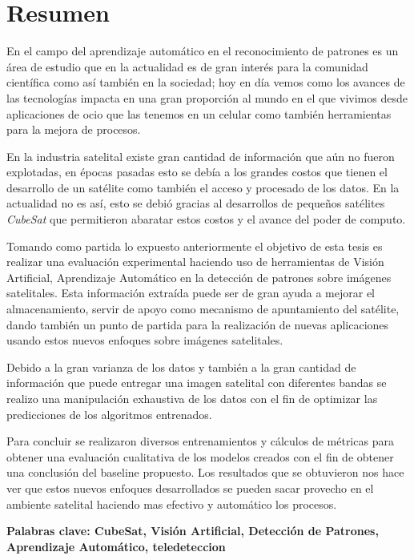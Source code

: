 \chapter*{Resumen}
\label{chap:resumen}

En el campo del aprendizaje automático en el reconocimiento de patrones es un área de estudio que en la actualidad es de gran interés para la comunidad científica como así también en la sociedad; hoy en día vemos como los avances de las tecnologías impacta en una gran proporción al mundo en el que vivimos desde aplicaciones de ocio que las tenemos en un celular como también herramientas para la mejora de procesos.

En la industria satelital existe gran cantidad de información que aún no fueron explotadas, en épocas pasadas esto se debía a los grandes costos que tienen el desarrollo de un satélite como también el acceso y procesado de los datos. En la actualidad no es así, esto se debió gracias al desarrollos de pequeños satélites \textit{CubeSat} que permitieron abaratar estos costos y el avance del poder de computo.

Tomando como partida lo expuesto anteriormente el objetivo de esta tesis es realizar una evaluación experimental haciendo uso  de herramientas de Visión Artificial, Aprendizaje Automático en la detección de patrones sobre imágenes satelitales. Esta información extraída puede ser de gran ayuda a mejorar el almacenamiento, servir de apoyo como mecanismo de apuntamiento del satélite, dando también un punto de partida para la realización de nuevas aplicaciones usando estos nuevos enfoques sobre imágenes satelitales.

Debido a la gran varianza de los datos y también a la gran cantidad de información que puede entregar una imagen satelital con diferentes bandas se realizo una manipulación exhaustiva de los datos con el fin de optimizar las predicciones de los algoritmos entrenados. 

Para concluir se realizaron diversos entrenamientos y cálculos de métricas para obtener una evaluación cualitativa de los modelos creados con el fin de obtener una conclusión del baseline propuesto. Los resultados que se obtuvieron nos hace ver que estos nuevos enfoques desarrollados se pueden sacar provecho en el ambiente satelital haciendo mas efectivo y automático los procesos.


\textbf{Palabras clave: CubeSat, Visión Artificial, Detección de Patrones, Aprendizaje Automático, teledeteccion}

